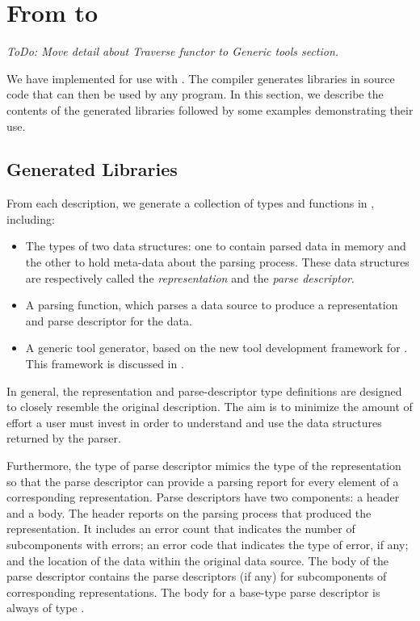 \section{From \padsmlbig{} to \ocamlbig{}}
\label{sec:padsml-impl}

{\em
ToDo: Move detail about Traverse functor to Generic tools section.
}

We have implemented \padsml{} for use with \ocaml{}. The \padsml{}
compiler generates libraries in \ocaml{} source code that can then be
used by any \ocaml{} program. In this section, we describe the
contents of the generated libraries followed by some examples
demonstrating their use.


\subsection{Generated Libraries}
\label{sec:gen-code}

From each \padsml{} description, we generate a collection of types and
functions in \ocaml{}, including:
\begin{itemize}
\item The types of two data structures: one to contain parsed data in
  memory and the other to hold meta-data about the parsing process.
  These data structures are respectively called the
  \emph{representation} and the \emph{parse descriptor}.
\item A parsing function, which parses a data source to produce a
  representation and parse descriptor for the data.
\item A generic tool generator, based on the new tool development
  framework for \padsml{}. This framework is discussed in
  .
\end{itemize} 

In general, the representation and parse-descriptor type definitions
are designed to closely resemble the original description.
The aim is to minimize the amount of effort a user must invest in
order to understand and use the data structures returned by the
parser.

Furthermore, the type of parse descriptor mimics the type of the
representation so that the parse descriptor can provide a parsing
report for every element of a corresponding representation. Parse
descriptors have two components: a header and a body. The header
reports on the parsing process that produced the representation. It
includes an error count that indicates the number of subcomponents
with errors; an error code that indicates the type of error, if any;
and the location of the data within the original data source. The body
of the parse descriptor contains the parse descriptors (if any) for
subcomponents of corresponding representations. The body for a
base-type parse descriptor is always of type .

